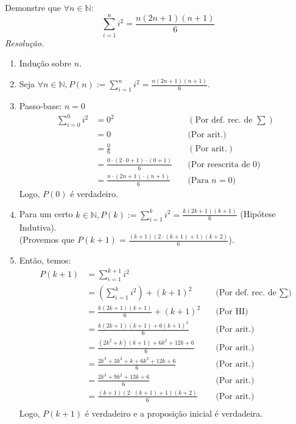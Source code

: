 Demonstre que $\forall n \in \mathbb{N}$:
\begin{displaymath}
	\sum\limits_{i=1}^n i^2 = \frac{n (2n+1) (n+1)}{6}
\end{displaymath}
\emph{Resolução.} 
\begin{enumerate}
	\item Indução sobre $n$.
	\item Seja $\forall n \in \mathbb{N}, P(n) := \sum\limits_{i=1}^n i^2 = \frac{n (2n+1) (n+1)}{6}$.
	\item Passo-base: $n = 0$
	\begin{align*}
		\sum\limits_{i=0}^0 i^2 &= 0^2 &\quad(\text{Por def. rec. de $\sum$}) \\
		&= 0 &\quad \text{(Por arit.)}\\
		&= \frac{0}{6} &\quad(\text{Por arit.}) \\
		&= \frac{0 \cdot (2 \cdot 0 + 1) \cdot (0 + 1)}{6} &\quad \text{(Por reescrita de 0)} \\
		&= \frac{n \cdot (2n + 1) \cdot (n + 1)}{6} &\quad \text{(Para $n = 0$)}  
	\end{align*}
	Logo, $P(0)$ é verdadeiro.
	\item Para um certo $k \in \mathbb{N}, P(k):= \sum\limits_{i=1}^k i^2 = \frac{k (2k+1) (k+1)}{6}$ (Hipótese Indutiva). \\
	(Provemos que $P(k+1) = \frac{(k+1) (2 \cdot (k+1) + 1) (k + 2)}{6}$). \\
	\item Então, temos:
	\begin{align*}
		P(k+1) &= \sum\limits_{i=1}^{k+1} i^2 \\
		&= (\sum\limits_{i=1}^{k} i^2) + (k+1)^2 &\quad \text{(Por def. rec. de $\sum$)} \\
		&= \frac{k (2k+1) (k+1)}{6} + (k+1)^2 &\quad \text{(Por HI)}\\
		&= \frac{k (2k+1) (k+1) + 6(k+1)^2}{6} &\quad \text{(Por arit.)}\\
		&= \frac{(2k^2 + k) (k+1) + 6k^2 + 12k + 6}{6} &\quad \text{(Por arit.)}\\
		&= \frac{2k^3 + 3k^2 + k + 6k^2 + 12k + 6}{6} &\quad \text{(Por arit.)}\\
		&= \frac{2k^3 + 9k^2 + 13k + 6}{6} &\quad \text{(Por arit.)}\\
		&= \frac{(k + 1) (2 \cdot (k+1) + 1) (k + 2)}{6} &\quad \text{(Por arit.)}\\
	\end{align*}
	Logo, $P(k+1)$ é verdadeiro e a proposição inicial é verdadeira.
\end{enumerate}

